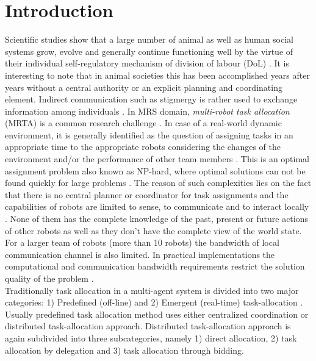 \documentclass{llncs}
\begin{document}
\section{Introduction}
\label{sec:intro}
Scientific studies show that a large number of animal as well as human social systems grow, evolve and generally continue functioning well by the virtue of their individual self-regulatory mechanism of division of labour (DoL) \cite{Camazine+2001}. It is interesting to note that in animal societies this has been accomplished years after years without a central authority or an explicit planning and coordinating element. Indirect communication such as stigmergy is rather used to exchange information among individuals \cite{Bonabeau+1999}. 
In MRS domain, \textit{multi-robot task allocation} (MRTA) is a common research challenge \cite{Gerkey+2004}. In case of a real-world dynamic environment, it is generally identified as the question of assigning tasks in an appropriate time to the appropriate robots considering the changes of the environment and/or the performance of other team members . This is an optimal assignment problem also known as NP-hard, where optimal solutions can not be found quickly for large problems \cite{Parker2008}. The reason of such complexities lies on the fact that there is no central planner or coordinator for task assignments and the capabilities of robots are limited to sense, to communicate and to interact locally \cite{Lerman+2006}. None of them has the complete knowledge of the past, present or future actions of other robots as well as they don't have the complete view of the world state. For a larger team of robots (more than 10 robots) the bandwidth of local communication channel is also limited. In practical implementations the computational and communication bandwidth requirements restrict the solution quality of the problem \cite{Gerkey+2004,Lerman+2006}.\\
Traditionally task allocation in a multi-agent system is divided into two major categories: 1) Predefined (off-line) and 2) Emergent (real-time) task-allocation \cite{Shen+2001}. Usually predefined task allocation method uses either centralized coordination or distributed task-allocation approach. Distributed task-allocation approach is again subdivided into three subcategories, namely 1) direct allocation, 2) task allocation by delegation and 3) task allocation through bidding.
\end{document}
